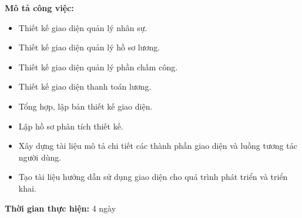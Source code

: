 {\begin{minipage}{\textwidth}
    \noindent \textbf{Mô tả công việc:}
    \begin{itemize}
        \item Thiết kế giao diện quản lý nhân sự.
        \item Thiết kế giao diện quản lý hồ sơ lương.
        \item Thiết kế giao diện quản lý phần chấm công.
        \item Thiết kế giao diện thanh toán lương.
        \item Tổng hợp, lập bản thiết kế giao diện.
        \item Lập hồ sơ phân tích thiết kế.
        \item Xây dựng tài liệu mô tả chi tiết các thành phần giao diện và luồng tương tác người dùng.
        \item Tạo tài liệu hướng dẫn sử dụng giao diện cho quá trình phát triển và triển khai.
    \end{itemize}
    \noindent \textbf{Thời gian thực hiện:} 4 ngày \\
    \end{minipage}
}
\newpage
